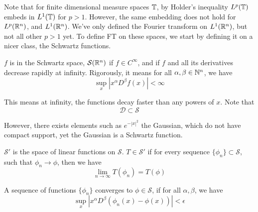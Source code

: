 Note that for finite dimensional measure spaces $\mathbb{T}$, by Holder's inequality $L^p(\mathbb{T})$ embeds in $L^1(\mathbb{T})$ for $p>1$. However, the same embedding does not hold for $L^p(\mathbb{R}^n)$, and $L^1(\mathbb{R}^n)$. We've only defined the Fourier transform on $L^1(\mathbb{R}^n)$, but not all other $p>1$ yet. To define FT on these spaces, we start by defining it on a nicer class, the Schwartz functions.

\begin{definition}
    $f$ is in the Schwartz space, $\mathcal{S}(\mathbb{R}^n)$ if $f\in C^\infty$, and if $f$ and all its derivatives decrease rapidly at infinity. Rigorously, it means for all $\alpha, \beta\in\mathbb{N}^n$, we have
    \begin{equation*}
        \sup_x|x^\alpha D^\beta f(x)|<\infty
    \end{equation*}
\end{definition}

This means at infinity, the functions decay faster than any powers of $x$. Note that
\begin{equation*}
    \mathcal{D}\subset\mathcal{S}
\end{equation*}

However, there exists elements such as $e^{-|x|^2}$ the Gaussian, which do not have compact support, yet the Gaussian is a Schwartz function.


\begin{definition}
    $\mathcal{S}'$ is the space of linear functions on $\mathcal{S}$. $T\in\mathcal{S}'$ if for every sequence $\{\phi_n\}\subset\mathcal{S}$, such that $\phi_n\to\phi$, then we have
    \begin{equation*}
        \lim_{n\to\infty}T(\phi_n)=T(\phi)
    \end{equation*}
\end{definition}
\begin{remark}
    A sequence of functions $\{\phi_n\}$ converges to $\phi\in\mathcal{S}$, if for all $\alpha, \beta$, we have
    \begin{equation*}
        \sup_x|x^\alpha D^\beta(\phi_n(x)-\phi(x))|<\epsilon
    \end{equation*}
\end{remark}

